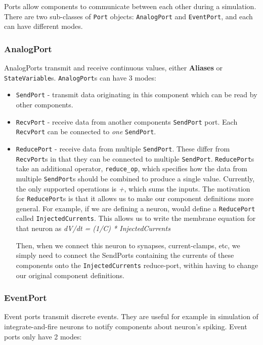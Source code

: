 \documentclass{article}
\newcommand{\nmlClass}[1]{{\tt #1}}
\begin{document}
Ports allow components to communicate between each other during a simulation.
There are two sub-classes of \nmlClass{Port} objects: \nmlClass{AnalogPort}
and \nmlClass{EventPort}, and each can have different modes.

\subsubsection{AnalogPort}

AnalogPorts transmit and receive continuous values, either \textbf{Aliases}
or {\tt StateVariable}s. {\tt AnalogPort}s can have 3 modes:
\begin{itemize}
\item {\tt SendPort} - transmit data originating in this component which can
be read by other components.
\item {\tt RecvPort} - receive data from another components {\tt SendPort}
port. Each {\tt RecvPort} can be connected to \emph{one} {\tt SendPort}.
\item {\tt ReducePort} - receive data from multiple {\tt SendPort}. These
differ from {\tt RecvPort}s in that they can be connected to multiple
{\tt SendPort}. {\tt ReducePort}s take an additional operator,
{\tt reduce\_op}, which specifies how the data from multiple {\tt SendPort}s
should be combined to produce a single value. Currently, the
only supported operations is \textsl{+}, which sums the inputs.
The motivation for {\tt ReducePort}s is that it allows us to make our
component definitions more general. For example, if we are defining a
neuron, would define a {\tt ReducePort} called {\tt InjectedCurrents}.
This allows us to write the membrane equation for that neuron as
\textsl{dV/dt = (1/C) * InjectedCurrents}

Then, when we connect this neuron to synapses, current-clamps, etc, we
simply need to connect the SendPorts containing the currents of these
components onto the {\tt InjectedCurrents} reduce-port, within having
to change our original component definitions.
\end{itemize}

\subsubsection{EventPort}
\label{eventPorts}

Event ports transmit discrete events. They are useful for example in
simulation of integrate-and-fire neurons to notify components about neuron's
spiking. Event ports only have 2 modes:
\end{document}
